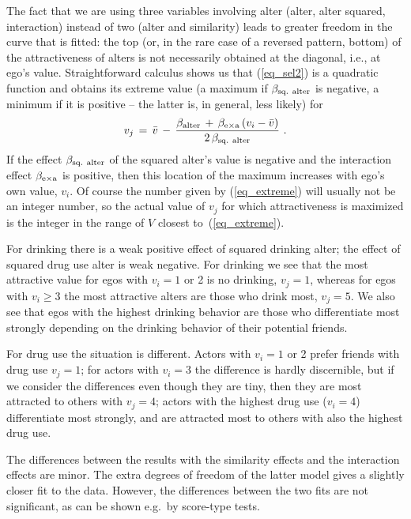 \documentclass[a4paper,fleqn,11pt]{article}
\newcommand{\+}{\, + \,}
\begin{document}
The fact that we are using three variables
involving alter
(alter, alter squared, interaction) instead of two
(alter and similarity) leads to greater freedom in the curve that is fitted:
the top (or, in the rare case of a reversed pattern, bottom)
of the attractiveness of alters is not necessarily
obtained at the diagonal, i.e., at ego's value.
Straightforward calculus shows us that (\ref{eq_sel2}) is a quadratic
function and obtains its extreme value (a maximum if $\beta_{\rm sq.\ alter} $
is negative, a minimum if it is positive -- the latter is, in general,
less likely) for
\begin{equation}
  v_j \,=\, \bar v \,-\, \frac{\beta_{\rm alter}
            \, + \,  \beta_{\rm e \times a} \, (v_i - \bar v)}
                              {2\, \beta_{\rm sq.\ alter}} \ .
                 \label{eq_extreme}
\end{equation}
If the effect $\beta_{\rm sq.\ alter}$ of the squared alter's value is negative
and the interaction effect $\beta_{\rm e \times a}$ is positive,
then this location of the maximum increases with ego's own value, $v_i$.
Of course the number given by (\ref{eq_extreme})
will usually not be an integer number,
so the actual value of $v_j$ for which attractiveness is maximized is
the integer in the range of $V$ closest to~(\ref{eq_extreme}).

For drinking there is a weak positive effect of squared drinking alter;
the effect of squared drug use alter is weak negative.
For drinking we see that the most attractive value
for egos with $v_i = 1$ or 2 is no drinking, $v_j = 1$,
whereas for egos with $v_i \geq 3$ the most attractive alters
are those who drink most, $v_j = 5$.
We also see that egos with the highest drinking
behavior are those who differentiate most strongly
depending on the drinking behavior of their potential friends.

For drug use the situation is different.
Actors with $v_i = 1$ or 2 prefer friends with drug use $v_j = 1$;
for actors with $v_i = 3$ the difference is hardly discernible,
but if we consider the differences even though they are tiny,
then they are most attracted to others with $v_j = 4$;
actors with the highest drug use ($v_i = 4$) differentiate most strongly,
and are attracted most to others with also the highest drug use.

The differences between the results with the similarity effects and the
interaction effects are minor. The extra degrees of freedom of the
latter model gives a slightly closer fit to the data.
However, the differences between the two fits are not significant,
as can be shown e.g.\ by score-type tests.
\end{document}
